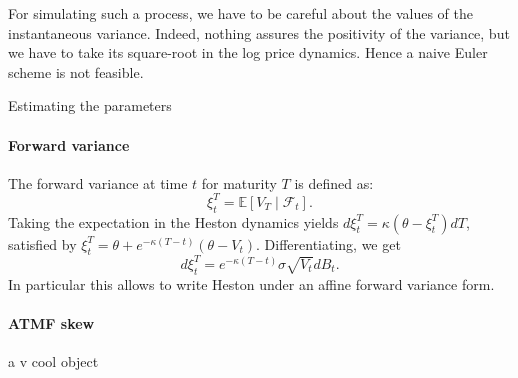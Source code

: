 For simulating such a process, we have to be careful about the values of the instantaneous variance. Indeed, nothing assures the positivity of the variance, but we have to take its square-root in the log price dynamics. Hence a naive Euler scheme is not feasible.

Estimating the parameters


\paragraph{Forward variance}

The forward variance at time $t$ for maturity $T$ is defined as:
\[ \xi_t^T = \mathbb{E}\left[V_T \mid \mathcal{F}_t \right]. \]
Taking the expectation in the Heston dynamics yields $d \xi_t^T = \kappa (\theta - \xi_t^T) dT$, satisfied by $\xi_t^T = \theta + e^{-\kappa (T-t)} (\theta - V_t)$.
\newline Differentiating, we get \[d \xi_t^T = e^{-\kappa (T-t)} \sigma \sqrt{V_t} dB_t.\] In particular this allows to write Heston under an affine forward variance form.

\paragraph{ATMF skew}

a v cool object
